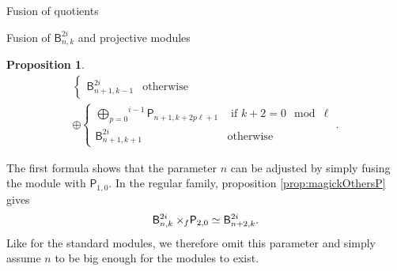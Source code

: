 \documentclass[reqno]{amsart}
\newtheorem{Prop}[Thm]{Proposition}
\newcommand{\dP}[1]{\mathsf P_{#1}}
\newcommand{\xf}{\times\hspace{-0.27em}_f}
\newcommand{\B}[2]{\mathsf{B}^{#1}_{#2}}
\newcommand{\lc}{\ell}
\begin{document}
\begin{section}{Fusion of quotients}
\begin{subsection}{Fusion of $\B{2i}{n,k}$ and projective modules}
\begin{Prop}
\begin{multline}
\begin{cases}
	 \B{2i}{n+1,k-1} & \text{otherwise}
	 \end{cases}\\
	 \oplus \begin{cases}
	 \overset{i-1}{\underset{p = 0}{\bigoplus}}\dP{n+1,k+2p\lc +1} & \text{ if } k+2 = 0 \mod \lc\\
	 \B{2i}{n+1,k+1} & \text{otherwise}
	 \end{cases}.
\end{multline}
\end{Prop}
The first formula shows that the parameter $n$ can be adjusted by simply fusing the module with $\dP{1,0}$. In the regular family,  proposition \ref{prop:magickOthersP} gives $$ \B{2i}{n,k} \xf \dP{2,0} \simeq \B{2i}{n+2,k}. $$ Like for the standard modules, we therefore omit this parameter and simply assume $n$ to be big enough for the modules to exist. 


\end{subsection}
\end{section}
\end{document}
